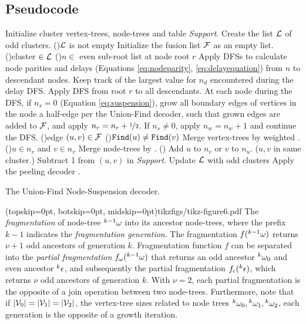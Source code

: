 \subsection{Pseudocode}\label{sec:pseudocode}
\begin{algorithm}[htb]
  \BlankLine
  \BlankLine
  Initialize cluster vertex-trees, node-trees and table \emph{Support}.\;\label{algo:B1a}
  Create the list $\mathcal{L}$ of odd clusters.\;
  \While(){$\mathcal{L}$ is not empty}{
    Initialize the fusion list $\mathcal{F}$ as an empty list.\;\label{algo:B1b}
    \For(){cluster $\in\mathcal{L}$ \label{algo:B2a}}{
      \For(){$n \in$ even sub-root list at node root $r$}{
        Apply DFSs to calculate node parities and delays (Equations \eqref{eq:nodeparity}, \eqref{eq:delayequation}) from $n$ to descendant nodes. Keep track of the largest value for $n_d$ encountered during the delay DFS.\;\label{algo:pdc}
      }
      Apply DFS from root $r$ to all descendants. At each node during the DFS, if $n_s=0$ (Equation \eqref{eq:suspension}), grow all boundary edges of vertices in the node a half-edge per the Union-Find decoder, such that grown edges are added to $\mathcal{F}$, and apply $n_r=n_r+\nicefrac{1}{2}$. If $n_s\neq0$, apply $n_w=n_w+1$ and continue the DFS.\;\label{algo:grow}
    }
    \For(){edge $(u,v) \in \mathcal{F}$\label{algo:B3a}}{
      \eIf(){$\texttt{Find}(u)\neq\texttt{Find}(v)$}{
        Merge vertex-trees by weighted .\;
        \eIf(){$u \in n_v$ and $v \in n_v$\label{algo:joina}}{
          Merge node-trees by .\;
        }(){
          Add $u$ to $n_v$ or $v$ to $n_u$.\;\label{algo:joinb}
        }
      }($u,v$ in same cluster.\label{algo:dfa}){
        Subtract 1 from $(u,v)$ in \emph{Support}.\;\label{algo:dfb}
      }
    }
    Update $\mathcal{L}$ with odd clusters\; \label{algo:B3b}
  }
  Apply the peeling decoder \cite{delfosse2017linear}.\label{algo:B4a}
  \caption{The Union-Find Node-Suspension decoder.}\label{algo:ufbb}
\end{algorithm}

\Figure[hbt](topskip=0pt, botskip=0pt, midskip=0pt){tikzfigs/tikz-figure6.pdf}{
  The \emph{fragmentation} of node-tree ${}^{k-1}\omega$ into its ancestor node-trees, where the prefix $k-1$ indicates the \emph{fragmentation generation}. The fragmentation $f({}^{k-1}\omega)$ returns $\nu+1$ odd ancestors of generation $k$. Fragmentation function $f$ can be separated into the \emph{partial fragmentation} $f_\omega({}^{k-1}\omega)$ that returns an odd ancestor ${}^{k}\omega_0$ and even ancestor ${}^{k}\epsilon$, and subsequently the partial fragmentation $f_\epsilon({}^{k}\epsilon)$, which returns $\nu$ odd ancestors of generation $k$. With $\nu=2$, each partial fragmentation is the opposite of a join operation between two node-trees. Furthermore, note that if $\lvert\mathcal{V}_0\rvert = \lvert\mathcal{V}_1\rvert = \lvert\mathcal{V}_2\rvert$, the vertex-tree sizes related to node trees ${}^{k}\omega_0, {}^{k}\omega_1, {}^{k}\omega_2$, each generation is the opposite of a growth iteration. \label{fig6}}


